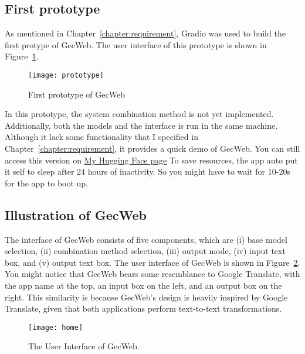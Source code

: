 \subsection{First prototype}

As mentioned in Chapter~\ref{chapter:requirement}, Gradio was used to build the first protype of GecWeb.
The user interface of this prototype is shown in Figure~\ref{fig:prototype}.

\begin{figure}[htbp]
  \begin{center}
    \texttt{[image: prototype]}
  \end{center}
  \caption{First prototype of GecWeb}\label{fig:prototype}
\end{figure}

In this prototype, the system combination method is not yet implemented.
Additionally, both the models and the interface is run in the same machine.
Although it lack some functionality that I specified in Chapter~\ref{chapter:requirement}, it provides a quick demo of GecWeb.
You can still access this version on \href{https://huggingface.co/spaces/canh25xp/gector_demo}{My Hugging Face page}
To save resources, the app auto put it self to sleep after 24 hours of inactivity.
So you might have to wait for 10-20s for the app to boot up.

\subsection{Illustration of GecWeb}

The interface of GecWeb consists of five components, which are (i) base model selection, (ii) combination method selection, (iii) output mode, (iv) input text box, and (v) output text box.
The user interface of GecWeb is shown in Figure~\ref{fig:home}.
You might notice that GecWeb bears some resemblance to Google Translate, with the app name at the top, an input box on the left, and an output box on the right.
This similarity is because GecWeb's design is heavily inspired by Google Translate, given that both applications perform text-to-text transformations.

\begin{figure}[htbp]
  \begin{center}
    \texttt{[image: home]}
  \end{center}
  \caption{The User Interface of GecWeb.}\label{fig:home}
\end{figure}

